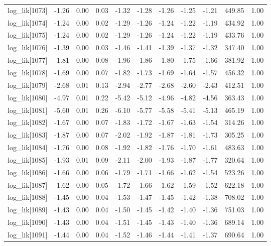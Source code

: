 \begin{table}[ht]
\begin{tabular}{rrrrrrrrrrr}
  log\_lik[1073] & -1.26 & 0.00 & 0.03 & -1.32 & -1.28 & -1.26 & -1.25 & -1.21 & 449.85 & 1.00 \\ 
  log\_lik[1074] & -1.24 & 0.00 & 0.02 & -1.29 & -1.26 & -1.24 & -1.22 & -1.19 & 434.92 & 1.00 \\ 
  log\_lik[1075] & -1.24 & 0.00 & 0.02 & -1.29 & -1.26 & -1.24 & -1.22 & -1.19 & 433.76 & 1.00 \\ 
  log\_lik[1076] & -1.39 & 0.00 & 0.03 & -1.46 & -1.41 & -1.39 & -1.37 & -1.32 & 347.40 & 1.00 \\ 
  log\_lik[1077] & -1.81 & 0.00 & 0.08 & -1.96 & -1.86 & -1.80 & -1.75 & -1.66 & 381.92 & 1.00 \\ 
  log\_lik[1078] & -1.69 & 0.00 & 0.07 & -1.82 & -1.73 & -1.69 & -1.64 & -1.57 & 456.32 & 1.00 \\ 
  log\_lik[1079] & -2.68 & 0.01 & 0.13 & -2.94 & -2.77 & -2.68 & -2.60 & -2.43 & 412.51 & 1.00 \\ 
  log\_lik[1080] & -4.97 & 0.01 & 0.22 & -5.42 & -5.12 & -4.96 & -4.82 & -4.56 & 363.43 & 1.00 \\ 
  log\_lik[1081] & -5.60 & 0.01 & 0.26 & -6.10 & -5.77 & -5.58 & -5.41 & -5.13 & 465.19 & 1.00 \\ 
  log\_lik[1082] & -1.67 & 0.00 & 0.07 & -1.83 & -1.72 & -1.67 & -1.63 & -1.54 & 314.26 & 1.00 \\ 
  log\_lik[1083] & -1.87 & 0.00 & 0.07 & -2.02 & -1.92 & -1.87 & -1.81 & -1.73 & 305.25 & 1.00 \\ 
  log\_lik[1084] & -1.76 & 0.00 & 0.08 & -1.92 & -1.82 & -1.76 & -1.70 & -1.61 & 483.63 & 1.00 \\ 
  log\_lik[1085] & -1.93 & 0.01 & 0.09 & -2.11 & -2.00 & -1.93 & -1.87 & -1.77 & 320.64 & 1.00 \\ 
  log\_lik[1086] & -1.66 & 0.00 & 0.06 & -1.79 & -1.71 & -1.66 & -1.62 & -1.54 & 523.26 & 1.00 \\ 
  log\_lik[1087] & -1.62 & 0.00 & 0.05 & -1.72 & -1.66 & -1.62 & -1.59 & -1.52 & 622.18 & 1.00 \\ 
  log\_lik[1088] & -1.45 & 0.00 & 0.04 & -1.53 & -1.47 & -1.45 & -1.42 & -1.38 & 708.02 & 1.00 \\ 
  log\_lik[1089] & -1.43 & 0.00 & 0.04 & -1.50 & -1.45 & -1.42 & -1.40 & -1.36 & 751.03 & 1.00 \\ 
  log\_lik[1090] & -1.43 & 0.00 & 0.04 & -1.51 & -1.45 & -1.43 & -1.40 & -1.36 & 689.14 & 1.00 \\ 
  log\_lik[1091] & -1.44 & 0.00 & 0.04 & -1.52 & -1.46 & -1.44 & -1.41 & -1.37 & 690.64 & 1.00 \\ 

\end{tabular}
\end{table}
